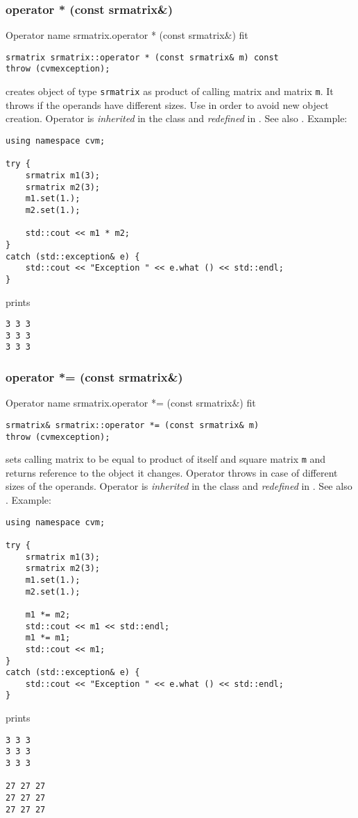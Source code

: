 \subsubsection{operator * (const srmatrix\&)}
Operator%
\pdfdest name {srmatrix.operator * (const srmatrix&)} fit
\begin{verbatim}
srmatrix srmatrix::operator * (const srmatrix& m) const
throw (cvmexception);
\end{verbatim}
creates  object of type \verb"srmatrix"
as  product of  calling matrix and  matrix \verb"m".
It throws  
if the operands have different sizes.
Use  in order to avoid
 new object creation.
Operator is \emph{inherited} in the class
and \emph{redefined} in .
See also
.
Example:
\begin{Verbatim}
using namespace cvm;

try {
    srmatrix m1(3);
    srmatrix m2(3);
    m1.set(1.);
    m2.set(1.);

    std::cout << m1 * m2;
}
catch (std::exception& e) {
    std::cout << "Exception " << e.what () << std::endl;
}
\end{Verbatim}
prints
\begin{Verbatim}
3 3 3
3 3 3
3 3 3
\end{Verbatim}
\newpage



\subsubsection{operator *= (const srmatrix\&)}
Operator%
\pdfdest name {srmatrix.operator *= (const srmatrix&)} fit
\begin{verbatim}
srmatrix& srmatrix::operator *= (const srmatrix& m)
throw (cvmexception);
\end{verbatim}
sets  calling matrix to be equal to  product
of itself and square matrix \verb"m"
and returns  reference to
the object it changes.
Operator throws 
in case of different sizes of the operands.
Operator is \emph{inherited} in the class
and \emph{redefined} in .
See also .
Example:
\begin{Verbatim}
using namespace cvm;

try {
    srmatrix m1(3);
    srmatrix m2(3);
    m1.set(1.);
    m2.set(1.);

    m1 *= m2;
    std::cout << m1 << std::endl;
    m1 *= m1;
    std::cout << m1;
}
catch (std::exception& e) {
    std::cout << "Exception " << e.what () << std::endl;
}
\end{Verbatim}
prints
\begin{Verbatim}
3 3 3
3 3 3
3 3 3

27 27 27
27 27 27
27 27 27
\end{Verbatim}
\newpage




